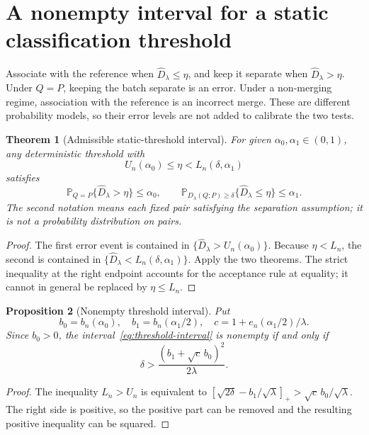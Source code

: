 \documentclass[11pt,a4paper]{article}
\newtheorem{theorem}{Theorem}[section]
\newtheorem{proposition}[theorem]{Proposition}
\theoremstyle{definition}
\theoremstyle{remark}
\newcommand{\Prob}{\mathbb P}
\newcommand{\D}{D_\lambda(Q;P)}
\newcommand{\Dh}{\widehat D_\lambda}
\newcommand{\pos}[1]{\left[#1\right]_+}
\begin{document}
\section{A nonempty interval for a static classification threshold}\label{sec:threshold}

Associate with the reference when $\Dh\le\eta$, and keep it separate when $\Dh>\eta$.
Under $Q=P$, keeping the batch separate is an error. Under a non-merging
regime, association with the reference is an incorrect merge. These are different probability
models, so their error levels are not added to calibrate the two tests.

\begin{theorem}[Admissible static-threshold interval]\label{cor:threshold}
For given $\alpha_0,\alpha_1\in(0,1)$, any deterministic threshold with
\begin{equation}\label{eq:threshold-interval}
 U_n(\alpha_0)\le\eta<L_n(\delta,\alpha_1)
\end{equation}
satisfies
\begin{equation}\label{eq:errors}
 \Prob_{Q=P}\{\Dh>\eta\}\le\alpha_0,\qquad
 \Prob_{\D\ge\delta}\{\Dh\le\eta\}\le\alpha_1.
\end{equation}
The second notation means each fixed pair satisfying the separation
assumption; it is not a probability distribution on pairs.
\end{theorem}
\begin{proof}
The first error event is contained in $\{\Dh>U_n(\alpha_0)\}$.
Because $\eta<L_n$, the second is contained in
$\{\Dh<L_n(\delta,\alpha_1)\}$. Apply the two theorems.
The strict inequality at the right endpoint accounts for the acceptance
rule at equality; it cannot in general be replaced by $\eta\le L_n$.
\end{proof}

\begin{proposition}[Nonempty threshold interval]\label{prop:nonempty}
Put
\[
 b_0=b_n(\alpha_0),\quad b_1=b_n(\alpha_1/2),\quad
 c=1+e_n(\alpha_1/2)/\lambda.
\]
Since $b_0>0$, the interval~\eqref{eq:threshold-interval} is nonempty
if and only if
\begin{equation}\label{eq:separation-condition}
 \boxed{\delta>\frac{(b_1+\sqrt c\,b_0)^2}{2\lambda}.}
\end{equation}
\end{proposition}
\begin{proof}
The inequality $L_n>U_n$ is equivalent to
$\pos{\sqrt{2\delta}-b_1/\sqrt\lambda}>\sqrt c\,b_0/\sqrt\lambda$.
The right side is positive, so the positive part can be removed and
the resulting positive inequality can be squared.
\end{proof}
\end{document}
